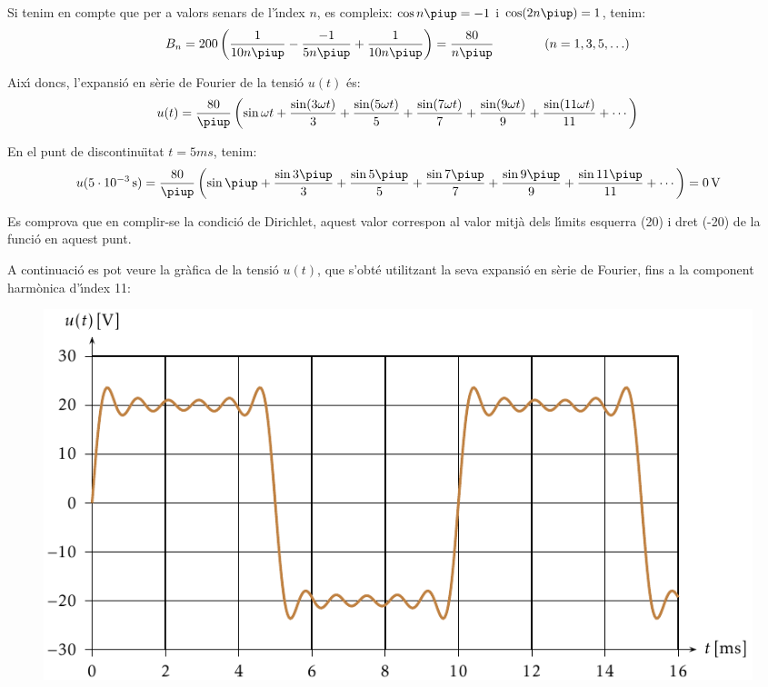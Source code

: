 \begin{exemple}
Si tenim en compte que per a valors senars de l'\'{\i}ndex $n$, es
compleix: $\cos n \piup = -1$ i $\cos (2 n \piup) = 1$, tenim:
\[
    B_n = 200 \left( \frac{1}{10 n \piup} - \frac{-1}{5 n \piup} +
    \frac{1}{10 n \piup} \right) = \frac{80}{n \piup}
    \qquad\qquad(n=1,3,5,\ldots)
\]

Aix\'{\i} doncs, l'expansi\'{o} en s\`{e}rie de Fourier de la tensi\'{o} $u(t)$ \'{e}s:
\[
    u(t) = \frac{80}{\piup} \left( \sin \omega t + \frac{\sin (3 \omega t)}{3} +
    \frac{\sin (5 \omega t)}{5} + \frac{\sin (7 \omega t)}{7} +
    \frac{\sin (9 \omega t)}{9} + \frac{\sin (11 \omega t)}{11} +\cdots\right)
\]

En el punt de discontinu\"{\i}tat $t=5\unit{ms}$, tenim:
\[
    u(5\cdot10^{-3}\unit{s}) =\frac{80}{\piup} \left( \sin \piup + \frac{\sin 3 \piup}{3} +
    \frac{\sin 5 \piup}{5} + \frac{\sin 7 \piup}{7} +
    \frac{\sin 9 \piup}{9} +\frac{\sin 11 \piup}{11}+\cdots\right) = 0\unit{V}
\]

Es comprova que en complir-se la condici\'{o} de Dirichlet, aquest valor
correspon al valor mitj\`{a} dels l\'{\i}mits esquerra (20) i dret (-20)  de
la funci\'{o} en aquest punt.

A continuaci\'{o} es pot veure la gr\`{a}fica de la tensi\'{o} $u(t)$, que
s'obt\'{e} utilitzant la seva expansi\'{o} en s\`{e}rie de Fourier, fins a la
component harm\`{o}nica d'\'{\i}ndex 11:
\vspace{5mm}
\begin{figure}[h!b]
\centering
    \includegraphics{Imatges/Cap-Fourier-Exemple-Tensio.pdf}
\end{figure}


\end{exemple}

